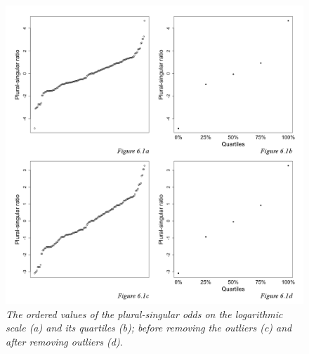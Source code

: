 \begin{figure} %
\centering
	    	\includegraphics[scale=0.38]{figures/6-Figure_1.png}
\vspace{2mm}
\caption{\textit{The ordered values of the plural-singular odds on the logarithmic scale (a) and its quartiles (b); before removing the outliers (c) and after removing outliers (d)}.}\label{fig:6:1}
\end{figure}

